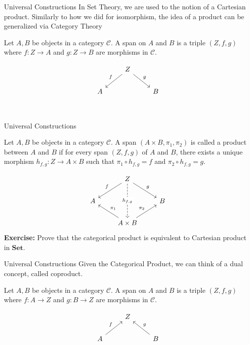\documentclass[aspectratio=169,xcolor=dvipsnames,10pt]{beamer}
\theoremstyle{definition}
\begin{document}
\begin{frame}[fragile]{Universal Constructions}
    In Set Theory, we are used to the notion of a Cartesian product.
    Similarly to how we did for isomorphism, the idea of a product can be generalized via Category Theory
	\begin{definition}[Span]
        Let $A,B$ be objects in a  category $\mathcal C$. A span
        on $A$ and $B$ is a triple $(Z,f,g)$ where $f:Z\to A$ and
        $g:Z\to B$ are morphisms in $\mathcal C$.
	\end{definition}
    \[\begin{tikzcd}
        & Z \\
        A && B \\
        \arrow["f"', from=1-2, to=2-1]
        \arrow["g", from=1-2, to=2-3]
    \end{tikzcd}\]
\end{frame}

\begin{frame}[fragile]{Universal Constructions}
    \begin{definition}
        Let $A,B$ be objects in a  category $\mathcal C$. A span $(A\times B, \pi_1, \pi_2)$
        is called a product between $A$ and $B$ if for every span $(Z, f, g)$ of $A$ and $B$,
        there exists a unique morphism $h_{f,g}:Z \to A \times B$ such that
        $\pi_1 \circ h_{f,g} = f$ and $\pi_2 \circ h_{f,g} = g$.
    \end{definition}
    \[\begin{tikzcd}
        & Z \\
        A && B \\
        & {A \times B}
        \arrow["f"', from=1-2, to=2-1]
        \arrow["g", from=1-2, to=2-3]
        \arrow["{h_{f,g}}"{description}, dashed, from=1-2, to=3-2]
        \arrow["{\pi_1}"', from=3-2, to=2-1]
        \arrow["{\pi_2}", from=3-2, to=2-3]
    \end{tikzcd}\]
    \textbf{Exercise:} Prove that the categorical product is equivalent to Cartesian product in $\mathbf{Set}$.
\end{frame}

\begin{frame}[fragile]{Universal Constructions}
    Given the Categorical Product, we can think of a dual concept, called coproduct.
	\begin{definition}[Cospan]
        Let $A,B$ be objects in a  category $\mathcal C$. A span
        on $A$ and $B$ is a triple $(Z,f,g)$ where $f:A\to Z$ and
        $g:B\to Z$ are morphisms in $\mathcal C$.
	\end{definition}
    \[\begin{tikzcd}
        & Z \\
        A && B \\
        \arrow["f", from=2-1, to=1-2]
        \arrow["g"', from=2-3, to=1-2]
    \end{tikzcd}\]
\end{frame}
\end{document}
